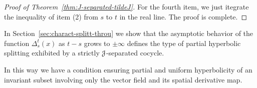 \documentclass[12pt,reqno]{amsart}
\numberwithin{equation}{section}
\newcommand{\qand}{\quad\text{and}\quad}
\theoremstyle{plain}
\theoremstyle{definition}
\newcommand{\J}{\EuScript{J}}
\begin{document}
\begin{proof}[Proof of Theorem~\ref{thm:J-separated-tildeJ}]
For the fourth item, we just itegrate the inequality of item
(2) from $s$ to $t$ in the real line. The proof is complete.

\end{proof}

In Section~\ref{sec:charact-splitt-throu} we show that the
asymptotic behavior of the function $\Delta_s^t(x)$
as $t-s$ grows to $\pm\infty$ defines the type of partial
hyperbolic splitting exhibited by a strictly $\J$-separated
cocycle.


In this way we have a condition ensuring partial and uniform hyperbolicity of
an invariant subset involving only the vector field and its
spatial derivative map.
\end{document}
